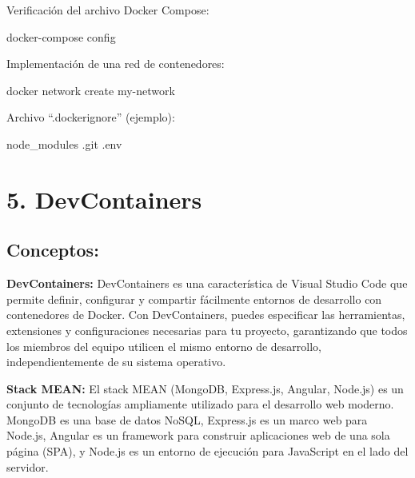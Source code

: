 \documentclass[
  a4paper,
  DIV=11,
  numbers=noendperiod,
  onepage,
  openany]{scrreprt}
\newenvironment{Shaded}{\begin{snugshade}}{\end{snugshade}}
\newcommand{\ExtensionTok}[1]{\textcolor[rgb]{0.00,0.23,0.31}{#1}}
\newcommand{\NormalTok}[1]{\textcolor[rgb]{0.00,0.23,0.31}{#1}}
\begin{document}
Verificación del archivo Docker Compose:

\begin{Shaded}
\begin{Highlighting}[]
\ExtensionTok{docker{-}compose}\NormalTok{ config}
\end{Highlighting}
\end{Shaded}

Implementación de una red de contenedores:

\begin{Shaded}
\begin{Highlighting}[]
\ExtensionTok{docker}\NormalTok{ network create my{-}network}
\end{Highlighting}
\end{Shaded}

Archivo ``.dockerignore'' (ejemplo):

\begin{Shaded}
\begin{Highlighting}[]
\ExtensionTok{node\_modules}
\ExtensionTok{.git}
\ExtensionTok{.env}
\end{Highlighting}
\end{Shaded}

\hypertarget{devcontainers}{%
\chapter{5. DevContainers}\label{devcontainers}}

\hypertarget{conceptos-4}{%
\section{Conceptos:}\label{conceptos-4}}

\textbf{DevContainers:} DevContainers es una característica de Visual
Studio Code que permite definir, configurar y compartir fácilmente
entornos de desarrollo con contenedores de Docker. Con DevContainers,
puedes especificar las herramientas, extensiones y configuraciones
necesarias para tu proyecto, garantizando que todos los miembros del
equipo utilicen el mismo entorno de desarrollo, independientemente de su
sistema operativo.

\textbf{Stack MEAN:} El stack MEAN (MongoDB, Express.js, Angular,
Node.js) es un conjunto de tecnologías ampliamente utilizado para el
desarrollo web moderno. MongoDB es una base de datos NoSQL, Express.js
es un marco web para Node.js, Angular es un framework para construir
aplicaciones web de una sola página (SPA), y Node.js es un entorno de
ejecución para JavaScript en el lado del servidor.
\end{document}
